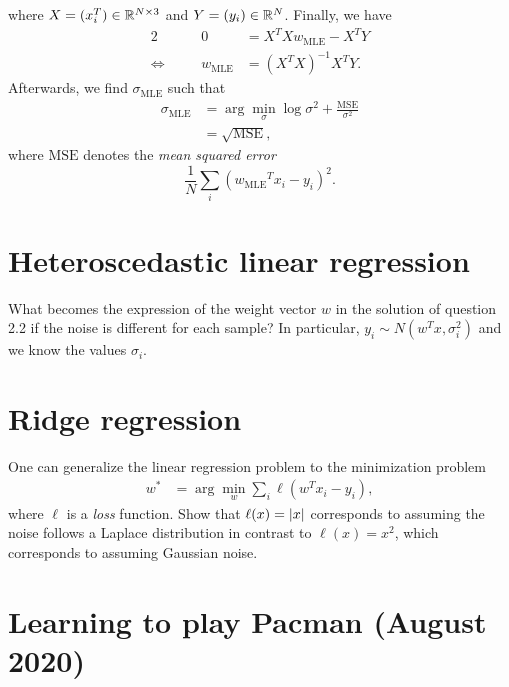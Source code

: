 \documentclass[11pt, a4paper]{article}
\begin{document}
\begin{enumerate}
\begin{solution}
        where $X = (x_i^T) \in \mathbb{R}^{N \times 3}$ and $Y = (y_i) \in \mathbb{R}^{N}$. Finally, we have
        \begin{alignat*}{2}
            && 0 & = X^T X w_{\text{MLE}} - X^T Y \\
            \Leftrightarrow \quad && w_{\text{MLE}} & = (X^T X)^{-1} X^T Y .
        \end{alignat*}
        Afterwards, we find $\sigma_{\text{MLE}}$ such that
        \begin{align*}
            \sigma_{\text{MLE}} & = \arg \min_\sigma \log \sigma^2 + \frac{\text{MSE}}{\sigma^2} \\
            & = \sqrt{\text{MSE}},
        \end{align*}
        where $\text{MSE}$ denotes the \emph{mean squared error}
        \begin{equation*}
            \frac{1}{N} \sum_i ({w_{\text{MLE}}}^T x_i - y_i)^2 .
        \end{equation*}
    \end{solution}
\end{enumerate}

\newpage

\section{Heteroscedastic linear regression}

What becomes the expression of the weight vector $w$ in the solution of question 2.2 if the noise is different for each sample? In particular, $y_i \sim N(w^T x, \sigma_i^2)$ and we know the values $\sigma_i$.

\newpage

\section{Ridge regression}

One can generalize the linear regression problem to the minimization problem
\begin{align*}
    w^* & = \arg \min_w \sum_i \ell(w^T x_i - y_i) ,
\end{align*}
where $\ell$ is a \emph{loss} function. Show that $\ell(x) = \lvert x\rvert$ corresponds to assuming the noise follows a Laplace distribution in contrast to $\ell(x) = x^2$, which corresponds to assuming Gaussian noise.

\newpage

\section{Learning to play Pacman (August 2020)}
\end{document}
